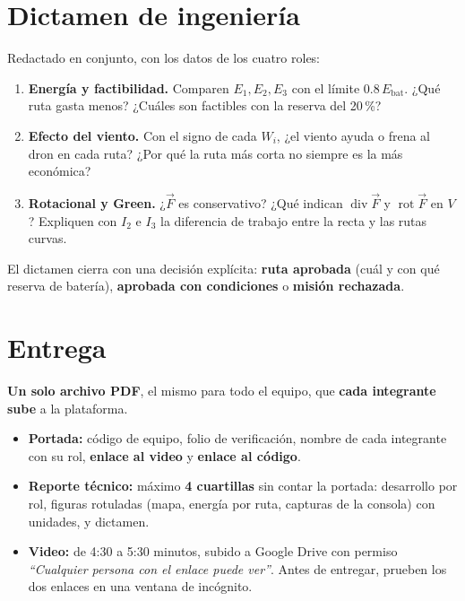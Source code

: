 \documentclass[11pt,letterpaper]{article}
\begin{document}
\section{Dictamen de ingeniería}
Redactado en conjunto, con los datos de los cuatro roles:
\begin{enumerate}
\item \textbf{Energía y factibilidad.} Comparen \(E_1,E_2,E_3\) con el límite \(0.8\,E_{\text{bat}}\). ¿Qué ruta gasta menos? ¿Cuáles son factibles con la reserva del 20\,\%?
\item \textbf{Efecto del viento.} Con el signo de cada \(W_i\), ¿el viento ayuda o frena al dron en cada ruta? ¿Por qué la ruta más corta no siempre es la más económica?
\item \textbf{Rotacional y Green.} ¿\(\vec F\) es conservativo? ¿Qué indican \(\operatorname{div}\vec F\) y \(\operatorname{rot}\vec F\) en \(V\)? Expliquen con \(I_2\) e \(I_3\) la diferencia de trabajo entre la recta y las rutas curvas.
\end{enumerate}
El dictamen cierra con una decisión explícita: \textbf{ruta aprobada} (cuál y con qué reserva de batería), \textbf{aprobada con condiciones} o \textbf{misión rechazada}.

\section{Entrega}
\textbf{Un solo archivo PDF}, el mismo para todo el equipo, que \textbf{cada integrante sube} a la plataforma.
\begin{itemize}
\item \textbf{Portada:} código de equipo, folio de verificación, nombre de cada integrante con su rol, \textbf{enlace al video} y \textbf{enlace al código}.
\item \textbf{Reporte técnico:} máximo \textbf{4 cuartillas} sin contar la portada: desarrollo por rol, figuras rotuladas (mapa, energía por ruta, capturas de la consola) con unidades, y dictamen.
\item \textbf{Video:} de 4:30 a 5:30 minutos, subido a Google Drive con permiso \emph{``Cualquier persona con el enlace puede ver''}. Antes de entregar, prueben los dos enlaces en una ventana de incógnito.
\end{itemize}
\end{document}
